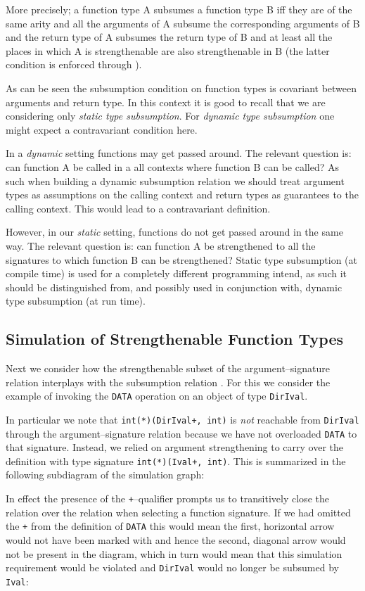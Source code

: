 \documentclass{sigplanconf}
\begin{document}
More precisely; a function type A subsumes a function type B iff they
are of the same arity and all the arguments of A subsume the
corresponding arguments of B and the return type of A subsumes the
return type of B and at least all the places in which A is
strengthenable are also strengthenable in B (the latter condition is
enforced through ). 

As can be seen the subsumption condition on function types is
covariant between arguments and return type. In this context it is
good to recall that we are considering only \emph{static type
  subsumption}.  For \emph{dynamic type subsumption} one might expect
a contravariant condition here.

In a \emph{dynamic} setting functions may get passed around.  The
relevant question is: can function A be called in a all contexts where
function B can be called? As such when building a dynamic subsumption
relation we should treat argument types as assumptions on the calling
context and return types as guarantees to the calling context. This
would lead to a contravariant definition.

However, in our \emph{static} setting, functions do not get passed
around in the same way. The relevant question is: can function A be
strengthened to all the signatures to which function B can be
strengthened? Static type subsumption (at compile time) is used for a
completely different programming intend, as such it should be
distinguished from, and possibly used in conjunction with, dynamic
type subsumption (at run time).

\subsection{Simulation of Strengthenable Function Types}

Next we consider how the strengthenable subset of the
argument--signature relation  interplays with
the subsumption relation . For this we consider the example
of invoking the \verb+DATA+ operation on an object of type
\verb+DirIval+.

In particular we note that \verb-int(*)(DirIval+, int)- is \emph{not}
reachable from \verb+DirIval+ through the 
argument--signature relation because we have not overloaded
\verb+DATA+ to that signature. Instead, we relied on argument
strengthening to carry over the definition with type signature
\verb-int(*)(Ival+, int)-. This is summarized in the following
subdiagram of the simulation graph:

In effect the presence of the \verb-+---qualifier prompts us to
transitively close the  relation over the
 relation when selecting a function signature. If we had
omitted the \verb-+- from the definition of \verb+DATA+ this would
mean the first, horizontal arrow would not have been marked with
 and hence the second, diagonal arrow would not be present in
the diagram, which in turn would mean that this simulation requirement
would be violated and \verb+DirIval+ would no longer be subsumed by
\verb+Ival+:
\end{document}
